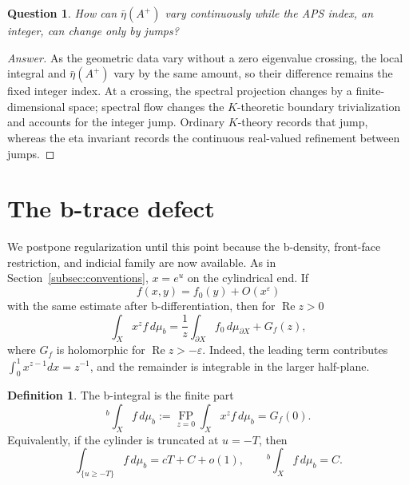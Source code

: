 \documentclass[12pt,oneside,reqno]{article}
\theoremstyle{plain}
\newtheorem{question}[theorem]{Question}
\theoremstyle{definition}
\newtheorem{definition}[theorem]{Definition}
\theoremstyle{remark}
\newenvironment{answer}{\begin{proof}[Answer]}{\end{proof}}
\begin{document}
\begin{question}
How can \(\bar\eta(A^+)\) vary continuously while the APS index, an
integer, can change only by jumps?
\end{question}

\begin{answer}
As the geometric data vary without a zero eigenvalue crossing, the local
integral and \(\bar\eta(A^+)\) vary by the same amount, so their difference
remains the fixed integer index. At a crossing, the spectral projection
changes by a finite-dimensional space; spectral flow changes the
\(K\)-theoretic boundary trivialization and accounts for the integer jump.
Ordinary \(K\)-theory records that jump, whereas the eta invariant records
the continuous real-valued refinement between jumps.
\end{answer}

\section{The b-trace defect}

We postpone regularization until this point because the b-density,
front-face restriction, and indicial family are now available.  As in
Section~\ref{subsec:conventions}, \(x=e^{u}\) on the cylindrical end.  If
\[
 f(x,y)=f_0(y)+O(x^\varepsilon)
\]
with the same estimate after b-differentiation, then for
\(\operatorname{Re}z>0\)
\[
 \int_Xx^zf\,d\mu_b
 =\frac1z\int_{\partial X}f_0\,d\mu_{\partial X}+G_f(z),
\]
where \(G_f\) is holomorphic for \(\operatorname{Re}z>-\varepsilon\).
Indeed, the leading term contributes
\(\int_0^1x^{z-1}dx=z^{-1}\), and the remainder is integrable in the
larger half-plane.

\begin{definition}
The b-integral is the finite part
\[
 {}^b\!\int_Xf\,d\mu_b
 :=\operatorname*{FP}_{z=0}\int_Xx^zf\,d\mu_b=G_f(0).
\]
Equivalently, if the cylinder is truncated at \(u=-T\), then
\[
 \int_{\{u\geq -T\}}f\,d\mu_b=cT+C+o(1),
 \qquad
 {}^b\!\int_Xf\,d\mu_b=C.
\]
\end{definition}
\end{document}
